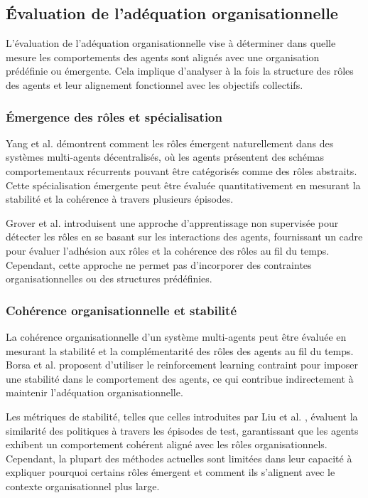 \documentclass[sigconf,anonymous]{aamas}
\begin{document}
\subsection{Évaluation de l'adéquation organisationnelle}
L'évaluation de l'adéquation organisationnelle vise à déterminer dans quelle mesure les comportements des agents sont alignés avec une organisation prédéfinie ou émergente. Cela implique d'analyser à la fois la structure des rôles des agents et leur alignement fonctionnel avec les objectifs collectifs.

\subsubsection{Émergence des rôles et spécialisation}
Yang et al. \cite{yang2021role} démontrent comment les rôles émergent naturellement dans des systèmes multi-agents décentralisés, où les agents présentent des schémas comportementaux récurrents pouvant être catégorisés comme des rôles abstraits. Cette spécialisation émergente peut être évaluée quantitativement en mesurant la stabilité et la cohérence à travers plusieurs épisodes.

Grover et al. \cite{grover2018role} introduisent une approche d'apprentissage non supervisée pour détecter les rôles en se basant sur les interactions des agents, fournissant un cadre pour évaluer l'adhésion aux rôles et la cohérence des rôles au fil du temps. Cependant, cette approche ne permet pas d'incorporer des contraintes organisationnelles ou des structures prédéfinies.

\subsubsection{Cohérence organisationnelle et stabilité}
La cohérence organisationnelle d'un système multi-agents peut être évaluée en mesurant la stabilité et la complémentarité des rôles des agents au fil du temps. Borsa et al. \cite{borsa2019constrained} proposent d'utiliser le reinforcement learning contraint pour imposer une stabilité dans le comportement des agents, ce qui contribue indirectement à maintenir l'adéquation organisationnelle.

Les métriques de stabilité, telles que celles introduites par Liu et al. \cite{liu2021efficient}, évaluent la similarité des politiques à travers les épisodes de test, garantissant que les agents exhibent un comportement cohérent aligné avec les rôles organisationnels. Cependant, la plupart des méthodes actuelles sont limitées dans leur capacité à expliquer pourquoi certains rôles émergent et comment ils s'alignent avec le contexte organisationnel plus large.
\end{document}
